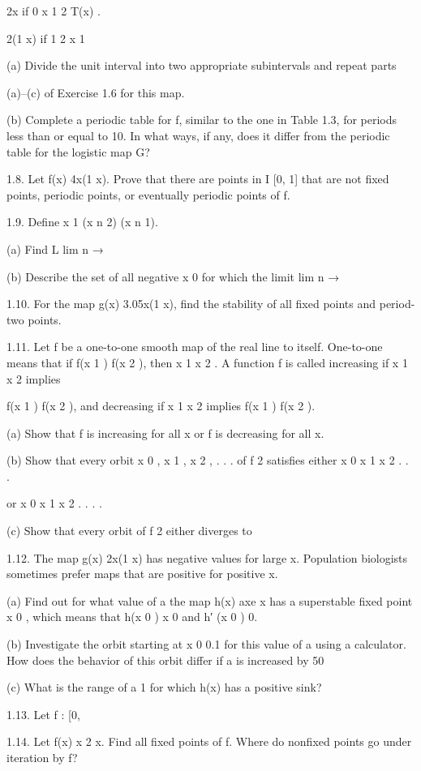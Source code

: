 \documentclass[12pt]{article}
\begin{document}
2x if 0 x 1  2 T(x)  . { 2(1  x) if 1  2 x 1

(a) Divide the unit interval into two appropriate subintervals and repeat parts

(a)–(c) of Exercise 1.6 for this map.

(b) Complete a periodic table for f, similar to the one in Table 1.3, for periods less than or equal to 10. 
In what ways, if any, does it differ from the periodic table for the logistic map G?

1.8. Let f(x)  4x(1  x). Prove that there are points in I  [0, 1] that are not ﬁxed points, periodic 
points, or eventually periodic points of f.

1.9. Deﬁne x 1  (x n 2)  (x n 1).

(a) Find L  lim n →   

(b) Describe the set of all negative x 0 for which the limit lim n → 

1.10. For the map g(x)  3.05x(1  x), ﬁnd the stability of all ﬁxed points and period-two points.

1.11. Let f be a one-to-one smooth map of the real line to itself. One-to-one means that if f(x 1 )  f(x 2 
), then x 1  x 2 . A function f is called increasing if x 1  x 2 implies

f(x 1 )  f(x 2 ), and decreasing if x 1  x 2 implies f(x 1 ) 
 f(x 2 ).

(a) Show that f is increasing for all x or f is decreasing for all x.

(b) Show that every orbit x 0 , x 1 , x 2 , . . .  of f 2 satisﬁes either x 0 
 x 1 
 x 2 
 . . .

or x 0 x 1 x 2 . . . .

(c) Show that every orbit of f 2 either diverges to 

1.12. The map g(x)  2x(1  x) has negative values for large x. Population biologists sometimes prefer maps 
that are positive for positive x.

(a) Find out for what value of a the map h(x)  axe x has a superstable ﬁxed point x 0 , which means that 
h(x 0 )  x 0 and h′ (x 0 )  0.

(b) Investigate the orbit starting at x 0  0.1 for this value of a using a calculator. How does the 
behavior of this orbit differ if a is increased by 50%

(c) What is the range of a 
 1 for which h(x) has a positive sink?

1.13. Let f : [0, 

1.14. Let f(x)  x 2 x. Find all ﬁxed points of f. Where do nonﬁxed points go under iteration by f?

}
\end{document}
